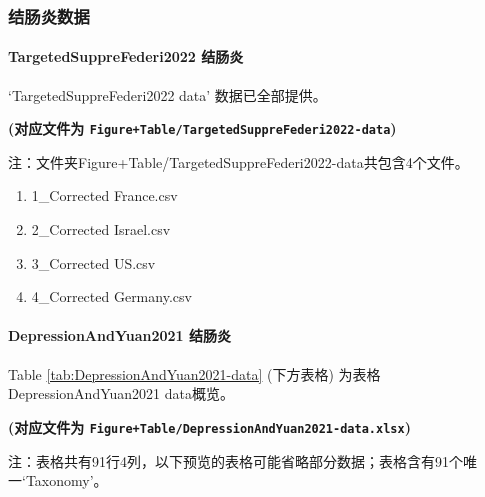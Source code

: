 \documentclass[
]{article}
\providecommand{\tightlist}{%
  \setlength{\itemsep}{0pt}\setlength{\parskip}{0pt}}
\begin{document}
\hypertarget{ux7ed3ux80a0ux708eux6570ux636e}{%
\subsubsection{结肠炎数据}\label{ux7ed3ux80a0ux708eux6570ux636e}}

\hypertarget{targetedsupprefederi2022-ux7ed3ux80a0ux708e}{%
\paragraph{TargetedSuppreFederi2022 结肠炎}\label{targetedsupprefederi2022-ux7ed3ux80a0ux708e}}

`TargetedSuppreFederi2022 data' 数据已全部提供。

\textbf{(对应文件为 \texttt{Figure+Table/TargetedSuppreFederi2022-data})}

\begin{center}\begin{tcolorbox}[colback=gray!10, colframe=gray!50, width=0.9\linewidth, arc=1mm, boxrule=0.5pt]注：文件夹Figure+Table/TargetedSuppreFederi2022-data共包含4个文件。

\begin{enumerate}\tightlist
\item 1\_Corrected France.csv
\item 2\_Corrected Israel.csv
\item 3\_Corrected US.csv
\item 4\_Corrected Germany.csv
\end{enumerate}\end{tcolorbox}
\end{center}

\hypertarget{depressionandyuan2021-ux7ed3ux80a0ux708e}{%
\paragraph{DepressionAndYuan2021 结肠炎}\label{depressionandyuan2021-ux7ed3ux80a0ux708e}}

Table \ref{tab:DepressionAndYuan2021-data} (下方表格) 为表格DepressionAndYuan2021 data概览。

\textbf{(对应文件为 \texttt{Figure+Table/DepressionAndYuan2021-data.xlsx})}

\begin{center}\begin{tcolorbox}[colback=gray!10, colframe=gray!50, width=0.9\linewidth, arc=1mm, boxrule=0.5pt]注：表格共有91行4列，以下预览的表格可能省略部分数据；表格含有91个唯一`Taxonomy'。
\end{tcolorbox}
\end{center}
\end{document}
